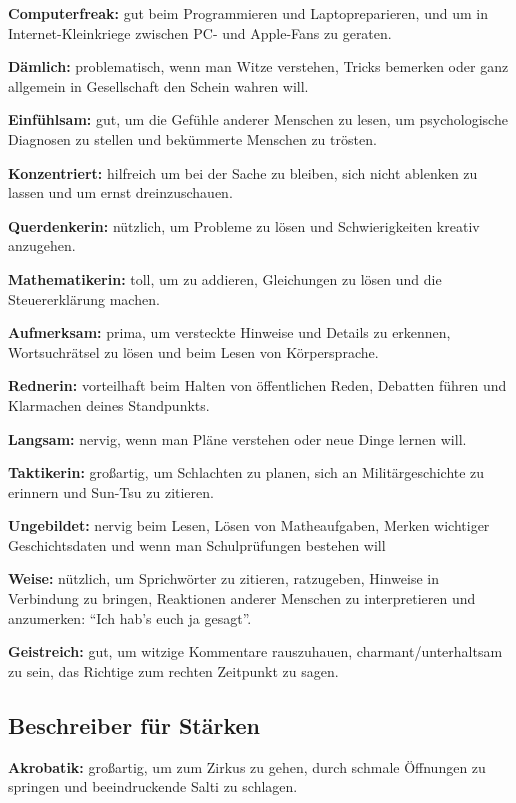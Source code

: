 \documentclass[]{article}
\begin{document}
\textbf{Computerfreak:} gut beim Programmieren und Laptopreparieren, und
um in Internet-Kleinkriege zwischen PC- und Apple-Fans zu geraten.

\textbf{Dämlich:} problematisch, wenn man Witze verstehen, Tricks
bemerken oder ganz allgemein in Gesellschaft den Schein wahren will.

\textbf{Einfühlsam:} gut, um die Gefühle anderer Menschen zu lesen, um
psychologische Diagnosen zu stellen und bekümmerte Menschen zu trösten.

\textbf{Konzentriert:} hilfreich um bei der Sache zu bleiben, sich nicht
ablenken zu lassen und um ernst dreinzuschauen.

\textbf{Querdenkerin:} nützlich, um Probleme zu lösen und
Schwierigkeiten kreativ anzugehen.

\textbf{Mathematikerin:} toll, um zu addieren, Gleichungen zu lösen und
die Steuererklärung machen.

\textbf{Aufmerksam:} prima, um versteckte Hinweise und Details zu
erkennen, Wortsuchrätsel zu lösen und beim Lesen von Körpersprache.

\textbf{Rednerin:} vorteilhaft beim Halten von öffentlichen Reden,
Debatten führen und Klarmachen deines Standpunkts.

\textbf{Langsam:} nervig, wenn man Pläne verstehen oder neue Dinge
lernen will.

\textbf{Taktikerin:} großartig, um Schlachten zu planen, sich an
Militärgeschichte zu erinnern und Sun-Tsu zu zitieren.

\textbf{Ungebildet:} nervig beim Lesen, Lösen von Matheaufgaben, Merken
wichtiger Geschichtsdaten und wenn man Schulprüfungen bestehen will

\textbf{Weise:} nützlich, um Sprichwörter zu zitieren, ratzugeben,
Hinweise in Verbindung zu bringen, Reaktionen anderer Menschen zu
interpretieren und anzumerken: ``Ich hab's euch ja gesagt''.

\textbf{Geistreich:} gut, um witzige Kommentare rauszuhauen,
charmant/unterhaltsam zu sein, das Richtige zum rechten Zeitpunkt zu
sagen.

\subsection{Beschreiber für
Stärken}\label{beschreiber-fuxfcr-stuxe4rken}

\textbf{Akrobatik:} großartig, um zum Zirkus zu gehen, durch schmale
Öffnungen zu springen und beeindruckende Salti zu schlagen.
\end{document}
